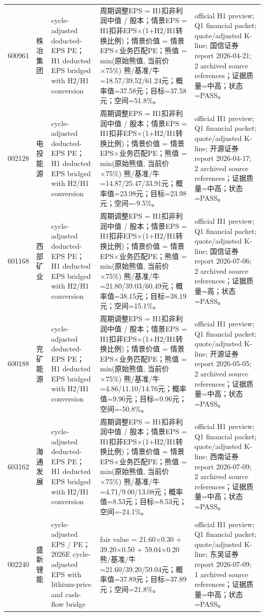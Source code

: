 \begin{longtable}{L{0.85cm}L{1.55cm}L{2.25cm}L{6.0cm}L{4.0cm}}
600961 & 株冶集团 & cycle-adjusted deducted-EPS PE；H1 deducted EPS bridged with H2/H1 conversion & 周期调整EPS = H1扣非利润中值 / 股本；情景EPS = H1扣非EPS×(1+H2/H1转换比例)；情景价值 = 情景EPS×业务匹配PE；熊值 = min(原始熊值, 当前价×75\%) 熊/基准/牛=18.57/39.52/61.24元；概率值=37.58元；目标=37.58元；空间=51.8\%。 & official H1 preview; Q1 financial packet; quote/adjusted K-line; 国信证券 report 2026-04-21; 2 archived source references；证据质量=中高；状态=PASS。 \\
002128 & 电投能源 & cycle-adjusted deducted-EPS PE；H1 deducted EPS bridged with H2/H1 conversion & 周期调整EPS = H1扣非利润中值 / 股本；情景EPS = H1扣非EPS×(1+H2/H1转换比例)；情景价值 = 情景EPS×业务匹配PE；熊值 = min(原始熊值, 当前价×75\%) 熊/基准/牛=14.87/25.47/33.91元；概率值=23.98元；目标=23.98元；空间=-9.5\%。 & official H1 preview; Q1 financial packet; quote/adjusted K-line; 开源证券 report 2026-04-17; 2 archived source references；证据质量=中高；状态=PASS。 \\
601168 & 西部矿业 & cycle-adjusted deducted-EPS PE；H1 deducted EPS bridged with H2/H1 conversion & 周期调整EPS = H1扣非利润中值 / 股本；情景EPS = H1扣非EPS×(1+H2/H1转换比例)；情景价值 = 情景EPS×业务匹配PE；熊值 = min(原始熊值, 当前价×75\%) 熊/基准/牛=21.80/39.03/60.49元；概率值=38.15元；目标=38.19元；空间=15.1\%。 & official H1 preview; Q1 financial packet; quote/adjusted K-line; 国信证券 report 2026-07-06; 2 archived source references；证据质量=高；状态=PASS。 \\
600188 & 兖矿能源 & cycle-adjusted deducted-EPS PE；H1 deducted EPS bridged with H2/H1 conversion & 周期调整EPS = H1扣非利润中值 / 股本；情景EPS = H1扣非EPS×(1+H2/H1转换比例)；情景价值 = 情景EPS×业务匹配PE；熊值 = min(原始熊值, 当前价×75\%) 熊/基准/牛=4.86/11.10/14.76元；概率值=9.96元；目标=9.96元；空间=-50.8\%。 & official H1 preview; Q1 financial packet; quote/adjusted K-line; 开源证券 report 2026-05-05; 2 archived source references；证据质量=中高；状态=PASS。 \\
603162 & 海通发展 & cycle-adjusted deducted-EPS PE；H1 deducted EPS bridged with H2/H1 conversion & 周期调整EPS = H1扣非利润中值 / 股本；情景EPS = H1扣非EPS×(1+H2/H1转换比例)；情景价值 = 情景EPS×业务匹配PE；熊值 = min(原始熊值, 当前价×75\%) 熊/基准/牛=4.71/9.00/13.08元；概率值=8.53元；目标=8.53元；空间=-24.1\%。 & official H1 preview; Q1 financial packet; quote/adjusted K-line; 西南证券 report 2026-07-09; 2 archived source references；证据质量=中高；状态=PASS。 \\
002240 & 盛新锂能 & cycle-adjusted EPS / PE；2026E cycle-adjusted EPS with lithium-price and cash-flow bridge & fair value = 21.60×0.30 + 39.20×0.50 + 59.04×0.20 熊/基准/牛=21.60/39.20/59.04元；概率值=37.89元；目标=37.89元；空间=21.8\%。 & official H1 preview; Q1 financial packet; quote/adjusted K-line; 东吴证券 report 2026-07-09; 1 archived source references；证据质量=中高；状态=PASS。 \\

\end{longtable}
